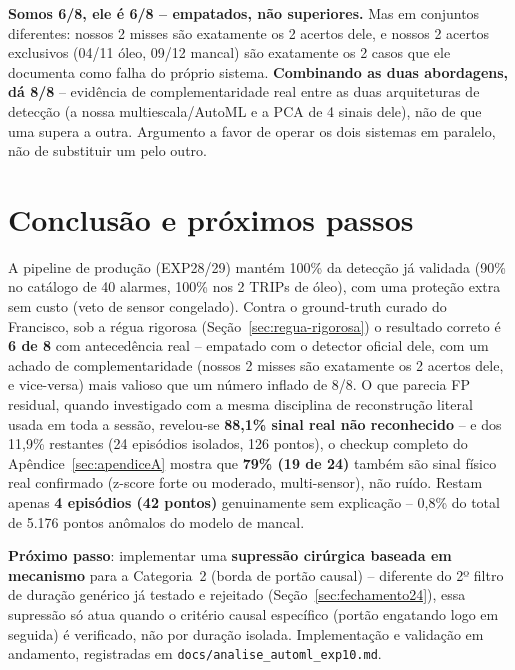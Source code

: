 \documentclass[11pt,a4paper]{article}
\begin{document}
\textbf{Somos 6/8, ele é 6/8 -- empatados, não superiores.} Mas em
conjuntos diferentes: nossos 2 misses são exatamente os 2 acertos
dele, e nossos 2 acertos exclusivos (04/11 óleo, 09/12 mancal) são
exatamente os 2 casos que ele documenta como falha do próprio sistema.
\textbf{Combinando as duas abordagens, dá 8/8} -- evidência de
complementaridade real entre as duas arquiteturas de detecção (a
nossa multiescala/AutoML e a PCA de 4 sinais dele), não de que uma
supera a outra. Argumento a favor de operar os dois sistemas em
paralelo, não de substituir um pelo outro.

\section{Conclusão e próximos passos}
\label{sec:conclusao}

A pipeline de produção (EXP28/29) mantém 100\% da detecção já validada
(90\% no catálogo de 40 alarmes, 100\% nos 2 TRIPs de óleo), com uma
proteção extra sem custo (veto de sensor congelado). Contra o
ground-truth curado do Francisco, sob a régua rigorosa
(Seção~\ref{sec:regua-rigorosa}) o resultado correto é \textbf{6 de 8}
com antecedência real -- empatado com o detector oficial dele, com um
achado de complementaridade (nossos 2 misses são exatamente os 2
acertos dele, e vice-versa) mais valioso que um número inflado de
8/8. O que parecia FP residual, quando
investigado com a mesma disciplina de reconstrução literal usada em
toda a sessão, revelou-se \textbf{88,1\% sinal real não reconhecido} --
e dos 11,9\% restantes (24 episódios isolados, 126 pontos), o checkup
completo do Apêndice~\ref{sec:apendiceA} mostra que \textbf{79\% (19
de 24)} também são sinal físico real confirmado (z-score forte ou
moderado, multi-sensor), não ruído. Restam apenas \textbf{4 episódios
(42 pontos)} genuinamente sem explicação -- 0,8\% do total de 5.176
pontos anômalos do modelo de mancal.

\textbf{Próximo passo}: implementar uma \textbf{supressão cirúrgica
baseada em mecanismo} para a Categoria~2 (borda de portão causal) --
diferente do 2º filtro de duração genérico já testado e rejeitado
(Seção~\ref{sec:fechamento24}), essa supressão só atua quando o
critério causal específico (portão engatando logo em seguida) é
verificado, não por duração isolada. Implementação e validação em
andamento, registradas em
\texttt{docs/analise\_automl\_exp10.md}.
\end{document}
